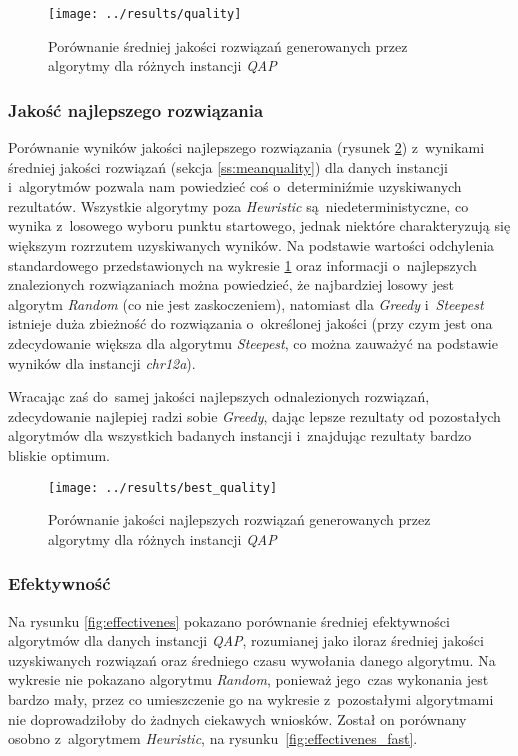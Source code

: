 \documentclass{article}
\begin{document}
			\begin{figure}[h]
				\texttt{[image: ../results/quality]}
				\caption{Porównanie średniej jakości rozwiązań generowanych przez algorytmy dla różnych instancji \emph{QAP}\label{fig:quality}}
			\end{figure}

		\subsubsection{Jakość najlepszego rozwiązania}

			Porównanie wyników jakości najlepszego rozwiązania (rysunek \ref{fig:best_quality}) z~wynikami średniej jakości rozwiązań (sekcja \ref{ss:meanquality}) dla danych instancji i~algorytmów pozwala nam powiedzieć coś o~determiniźmie uzyskiwanych rezultatów. Wszystkie algorytmy poza \emph{Heuristic} są~niedeterministyczne, co wynika z~losowego wyboru punktu startowego, jednak niektóre charakteryzują się większym rozrzutem uzyskiwanych wyników. Na podstawie wartości odchylenia standardowego przedstawionych na wykresie \ref{fig:quality} oraz informacji o~najlepszych znalezionych rozwiązaniach można powiedzieć, że najbardziej losowy jest algorytm \emph{Random} (co nie jest zaskoczeniem), natomiast dla \emph{Greedy} i~\emph{Steepest} istnieje duża zbieżność do rozwiązania o~określonej jakości (przy czym jest ona zdecydowanie większa dla algorytmu \emph{Steepest}, co można zauważyć na podstawie wyników dla instancji \emph{chr12a}).


			Wracając zaś do~samej jakości najlepszych odnalezionych rozwiązań, zdecydowanie najlepiej radzi sobie \emph{Greedy}, dając lepsze rezultaty od pozostałych algorytmów dla wszystkich badanych instancji i~znajdując rezultaty bardzo bliskie optimum.

		 	\begin{figure}[h]
				\texttt{[image: ../results/best\_quality]}
				\caption{Porównanie jakości najlepszych rozwiązań generowanych przez algorytmy dla różnych instancji \emph{QAP}\label{fig:best_quality}}
			\end{figure}

		\subsubsection{Efektywność}

			Na rysunku \ref{fig:effectivenes} pokazano porównanie średniej efektywności algorytmów dla danych instancji \emph{QAP}, rozumianej jako iloraz średniej jakości uzyskiwanych rozwiązań oraz średniego czasu wywołania danego algorytmu. Na wykresie nie pokazano algorytmu \emph{Random}, ponieważ jego~czas wykonania jest bardzo mały, przez co umieszczenie go na wykresie z~pozostałymi algorytmami nie doprowadziłoby do żadnych ciekawych wniosków. Został on porównany osobno z~algorytmem \emph{Heuristic}, na rysunku~\ref{fig:effectivenes_fast}.
\end{document}
